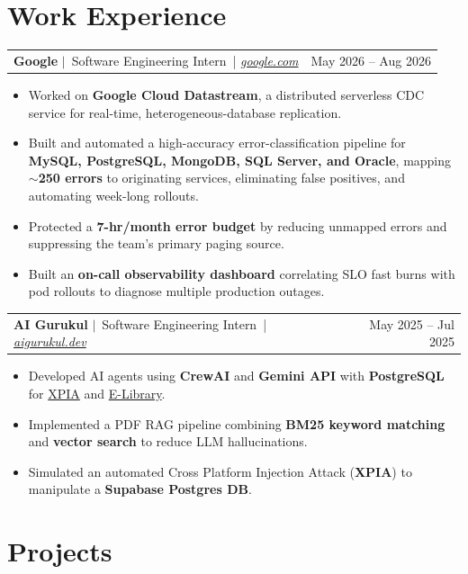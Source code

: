 \documentclass[10pt,letterpaper]{article}
\makeatletter
\newcommand{\resumeProjectHeading}[2]{
  \vspace{1.5pt}
  \noindent
  \begin{tabularx}{\linewidth}{@{}X r@{}}
    #1 & #2 \\
  \end{tabularx}\vspace{-1.5pt}
}
\makeatother
\begin{document}
\section*{Work Experience}
\resumeProjectHeading{\textbf{Google} $\vert$\ Software Engineering Intern\ | \textit{\href{https://www.google.com}{google.com}}} {May 2026 -- Aug 2026}
\begin{itemize}
    \vspace{1pt}
    \item Worked on \textbf{Google Cloud Datastream}, a distributed serverless CDC service for real-time, heterogeneous-database replication.
    \item Built and automated a high-accuracy error-classification pipeline for \textbf{MySQL, PostgreSQL, MongoDB, SQL Server, and Oracle}, mapping \textbf{$\sim$250 errors} to originating services, eliminating false positives, and automating week-long rollouts.
    \item Protected a \textbf{7-hr/month error budget} by reducing unmapped errors and suppressing the team’s primary paging source.
    \item Built an \textbf{on-call observability dashboard} correlating SLO fast burns with pod rollouts to diagnose multiple production outages.
\end{itemize}

\vspace{4pt}
\resumeProjectHeading{\textbf{AI Gurukul} $\vert$\ Software Engineering Intern\ | \textit{\href{https://www.aigurukul.dev/}{aigurukul.dev}}} {May 2025 -- Jul 2025}
\begin{itemize}
    \vspace{1pt}
    \item Developed AI agents using \textbf{CrewAI} and \textbf{Gemini API} with \textbf{PostgreSQL} for \href{https://github.com/Darelife/xpia}{XPIA} and \href{https://github.com/Darelife/BITS_PS1/tree/main/PrakharAndSagar_GenAiOps}{E-Library}.
    \item Implemented a PDF RAG pipeline combining \textbf{BM25 keyword matching} and \textbf{vector search} to reduce LLM hallucinations.
    \item Simulated an automated Cross Platform Injection Attack (\textbf{XPIA}) to manipulate a \textbf{Supabase Postgres DB}.
\end{itemize}

\section*{Projects}
\end{document}
